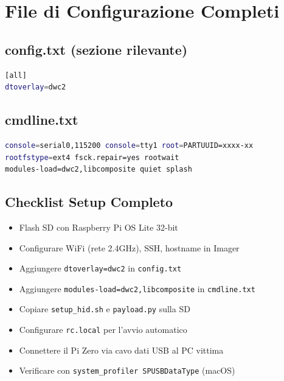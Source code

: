 \documentclass[12pt,a4paper]{article}
\begin{document}
\newpage

\appendix
\section{File di Configurazione Completi}

\subsection{config.txt (sezione rilevante)}
\begin{lstlisting}[language=bash]
[all]
dtoverlay=dwc2
\end{lstlisting}

\subsection{cmdline.txt}
\begin{lstlisting}[language=bash]
console=serial0,115200 console=tty1 root=PARTUUID=xxxx-xx 
rootfstype=ext4 fsck.repair=yes rootwait 
modules-load=dwc2,libcomposite quiet splash
\end{lstlisting}

\subsection{Checklist Setup Completo}
\begin{itemize}[label=$\square$]
    \item Flash SD con Raspberry Pi OS Lite 32-bit
    \item Configurare WiFi (rete 2.4GHz), SSH, hostname in Imager
    \item Aggiungere \texttt{dtoverlay=dwc2} in \texttt{config.txt}
    \item Aggiungere \texttt{modules-load=dwc2,libcomposite} in \texttt{cmdline.txt}
    \item Copiare \texttt{setup\_hid.sh} e \texttt{payload.py} sulla SD
    \item Configurare \texttt{rc.local} per l'avvio automatico
    \item Connettere il Pi Zero via cavo dati USB al PC vittima
    \item Verificare con \texttt{system\_profiler SPUSBDataType} (macOS)
\end{itemize}
\end{document}
